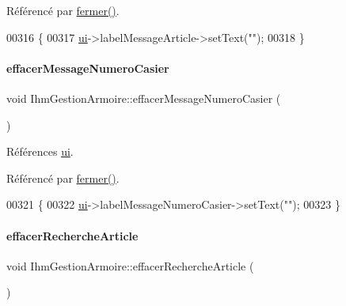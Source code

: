 Référencé par \hyperlink{class_ihm_gestion_armoire_a7fef1d21e4dcce9c4550d33b15e8dc29}{fermer()}.


\begin{DoxyCode}
00316 \{
00317     \hyperlink{class_ihm_gestion_armoire_a793a2816dc21b3161566138d2af5a8b9}{ui}->labelMessageArticle->setText(\textcolor{stringliteral}{""});
00318 \}
\end{DoxyCode}
\mbox{\label{class_ihm_gestion_armoire_a38dab807125ddb3baecf9345906e3c4b}} 
\paragraph{\texorpdfstring{effacer\+Message\+Numero\+Casier}{effacerMessageNumeroCasier}}
{\footnotesize\ttfamily void Ihm\+Gestion\+Armoire\+::effacer\+Message\+Numero\+Casier (\begin{DoxyParamCaption}{ }\end{DoxyParamCaption})\hspace{0.3cm}{\ttfamily [slot]}}



Références \hyperlink{class_ihm_gestion_armoire_a793a2816dc21b3161566138d2af5a8b9}{ui}.



Référencé par \hyperlink{class_ihm_gestion_armoire_a7fef1d21e4dcce9c4550d33b15e8dc29}{fermer()}.


\begin{DoxyCode}
00321 \{
00322     \hyperlink{class_ihm_gestion_armoire_a793a2816dc21b3161566138d2af5a8b9}{ui}->labelMessageNumeroCasier->setText(\textcolor{stringliteral}{""});
00323 \}
\end{DoxyCode}
\mbox{\label{class_ihm_gestion_armoire_a71c12ea50f463c14c835b02d3db22025}} 
\paragraph{\texorpdfstring{effacer\+Recherche\+Article}{effacerRechercheArticle}}
{\footnotesize\ttfamily void Ihm\+Gestion\+Armoire\+::effacer\+Recherche\+Article (\begin{DoxyParamCaption}{ }\end{DoxyParamCaption})\hspace{0.3cm}{\ttfamily [slot]}}



